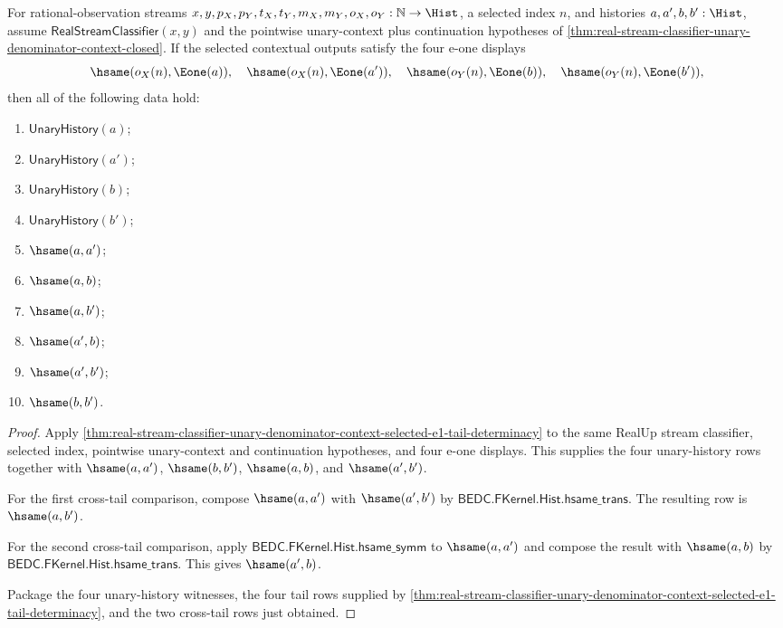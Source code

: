 \begin{theorem}
\label{thm:real-stream-classifier-unary-denominator-context-selected-e1-tail-pairwise-coherence}
For rational-observation streams
$x,y,p_X,p_Y,t_X,t_Y,m_X,m_Y,o_X,o_Y:\mathbb{N}\to\Hist$, a selected
index $n$, and histories $a,a',b,b':\Hist$, assume
$\mathsf{RealStreamClassifier}(x,y)$ and the pointwise unary-context plus
continuation hypotheses of
\autoref{thm:real-stream-classifier-unary-denominator-context-closed}. If the
selected contextual outputs satisfy the four e-one displays
$$
\hsame(o_X(n),\Eone(a)),\quad
\hsame(o_X(n),\Eone(a')),\quad
\hsame(o_Y(n),\Eone(b)),\quad
\hsame(o_Y(n),\Eone(b')),
$$
then all of the following data hold:
\begin{enumerate}
\item $\mathsf{UnaryHistory}(a)$;
\item $\mathsf{UnaryHistory}(a')$;
\item $\mathsf{UnaryHistory}(b)$;
\item $\mathsf{UnaryHistory}(b')$;
\item $\hsame(a,a')$;
\item $\hsame(a,b)$;
\item $\hsame(a,b')$;
\item $\hsame(a',b)$;
\item $\hsame(a',b')$;
\item $\hsame(b,b')$.
\end{enumerate}
\end{theorem}
\begin{proof}
Apply
\autoref{thm:real-stream-classifier-unary-denominator-context-selected-e1-tail-determinacy}
to the same RealUp stream classifier, selected index, pointwise unary-context
and continuation hypotheses, and four e-one displays. This supplies the four
unary-history rows together with $\hsame(a,a')$, $\hsame(b,b')$,
$\hsame(a,b)$, and $\hsame(a',b')$.

For the first cross-tail comparison, compose $\hsame(a,a')$ with
$\hsame(a',b')$ by
$\mathsf{BEDC.FKernel.Hist.hsame\_trans}$. The resulting row is
$\hsame(a,b')$.

For the second cross-tail comparison, apply
$\mathsf{BEDC.FKernel.Hist.hsame\_symm}$ to $\hsame(a,a')$ and compose the
result with $\hsame(a,b)$ by
$\mathsf{BEDC.FKernel.Hist.hsame\_trans}$. This gives $\hsame(a',b)$.

Package the four unary-history witnesses, the four tail rows supplied by
\autoref{thm:real-stream-classifier-unary-denominator-context-selected-e1-tail-determinacy},
and the two cross-tail rows just obtained.
\end{proof}

